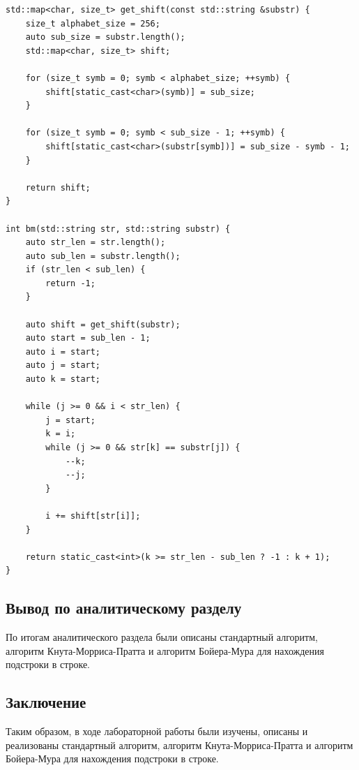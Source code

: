 \documentclass[a4paper,12pt]{article}
\begin{document}
\begin{lstlisting}[frame=single,caption=Стандартный алгоритм, breaklines]
std::map<char, size_t> get_shift(const std::string &substr) {
    size_t alphabet_size = 256;
    auto sub_size = substr.length();
    std::map<char, size_t> shift;

    for (size_t symb = 0; symb < alphabet_size; ++symb) {
        shift[static_cast<char>(symb)] = sub_size;
    }

    for (size_t symb = 0; symb < sub_size - 1; ++symb) {
        shift[static_cast<char>(substr[symb])] = sub_size - symb - 1;
    }

    return shift;
}

int bm(std::string str, std::string substr) {
    auto str_len = str.length();
    auto sub_len = substr.length();
    if (str_len < sub_len) {
        return -1;
    }

    auto shift = get_shift(substr);
    auto start = sub_len - 1;
    auto i = start;
    auto j = start;
    auto k = start;

    while (j >= 0 && i < str_len) {
        j = start;
        k = i;
        while (j >= 0 && str[k] == substr[j]) {
            --k;
            --j;
        }

        i += shift[str[i]];
    }

    return static_cast<int>(k >= str_len - sub_len ? -1 : k + 1);
}
\end{lstlisting}
	\begin{center}
	\subsection{Вывод по аналитическому разделу}
	\end{center}	
	По итогам аналитического раздела были описаны стандартный алгоритм, алгоритм Кнута-Морриса-Пратта и алгоритм Бойера-Мура для нахождения подстроки в строке.

    \newpage

    \begin{center}
        \section*{Заключение}
    \end{center}
            \label{sec:ending}


        Таким образом, в ходе лабораторной работы были изучены, описаны и реализованы стандартный алгоритм, алгоритм Кнута-Морриса-Пратта и алгоритм Бойера-Мура для нахождения подстроки в строке. 
\end{document}
